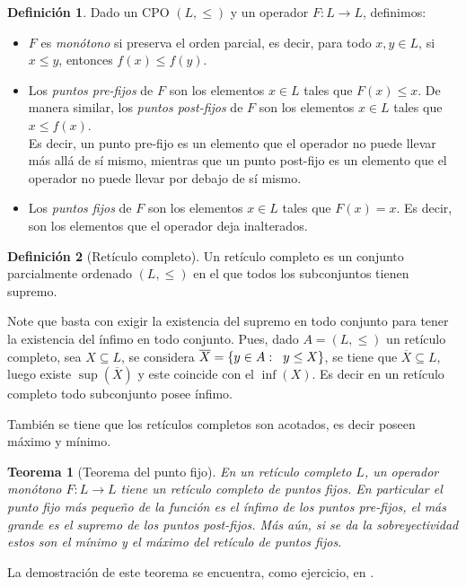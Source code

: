 \documentclass[11pt,oneside]{report}
\theoremstyle{plain}
\newtheorem{teo}{Teorema}[chapter]
\theoremstyle{definition}
\newtheorem{defi}{Definición}[chapter]
\begin{document}
\begin{defi}
    Dado un CPO $(L, \leq)$ y un operador $F: L \rightarrow L$, definimos:
    \begin{itemize}
        \item $F$ es \emph{monótono} si preserva el orden parcial, es decir, para todo $x, y \in L$, si $x \leq y$, entonces $f(x) \leq f(y)$.
        \item Los \emph{puntos pre-fijos} de $F$ son los elementos $x \in L$ tales que $F(x) \leq x$. De manera similar, los \emph{puntos post-fijos} de $F$ son los elementos $x \in L$ tales que $x \leq f(x)$.\\
              Es decir, un punto pre-fijo es un elemento que el operador no puede llevar más allá de sí mismo, mientras que un punto post-fijo es un elemento que el operador no puede llevar por debajo de sí mismo.
        \item Los \emph{puntos fijos} de $F$ son los elementos $x \in L$ tales que $F(x) = x$. Es decir, son los elementos que el operador deja inalterados.
    \end{itemize}
\end{defi}

\begin{defi}[Retículo completo]
    Un retículo completo es un conjunto parcialmente ordenado $(L,\leq)$ en el que todos los subconjuntos tienen supremo.
\end{defi}
Note que basta con exigir la existencia del supremo en todo conjunto para tener la existencia del ínfimo en todo conjunto. Pues, dado $A=(L,\leq)$ un retículo completo, sea $X \subseteq L$, se considera $\overline{X} = \{y\in A : \hspace{2mm} y \leq X\}$, se tiene que  $\overline{X} \subseteq L$, luego existe $\sup(\overline{X})$ y este coincide con el $\inf(X)$.
Es decir en un retículo completo todo subconjunto posee ínfimo.

También se tiene que los retículos completos son acotados, es decir poseen máximo y mínimo.

\begin{teo}[Teorema del punto fijo]
    En un retículo completo $L$, un operador monótono $F:L\rightarrow L$ tiene un retículo completo de puntos fijos. En particular el punto fijo más pequeño de la función es el ínfimo de los puntos pre-fijos, el más grande es el supremo de los puntos post-fijos. Más aún, si se da la sobreyectividad estos son el mínimo y el máximo del retículo de puntos fijos.
\end{teo}
La demostración de este teorema se encuentra, como ejercicio, en \cite{Davide Sangiorgi}.
\end{document}
